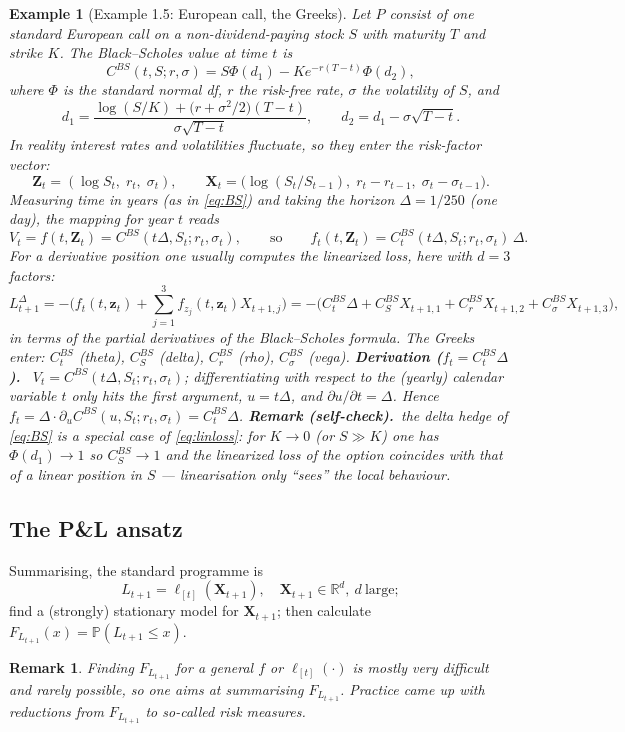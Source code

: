 \documentclass[11pt,a4paper]{article}
\newtheorem{example}{Example}
\newtheorem{remark}{Remark}
\newcommand{\real}{\mathbb{R}}
\renewcommand{\P}{\mathbb{P}}
\newcommand{\der}[1]{\medskip\noindent\textbf{Derivation (#1).}\ }
\newcommand{\selfcheck}[1]{\medskip\noindent\textbf{Remark (self-check).}\ \textit{#1}}
\begin{document}
\begin{example}[Example 1.5: European call, the Greeks]\label{ex:bs}
Let $P$ consist of one standard European call on a non-dividend-paying stock $S$ with maturity $T$
and strike $K$. The Black--Scholes value at time $t$ is
\begin{equation}\label{eq:BS}
  C^{BS}(t,S;r,\sigma)=S\Phi(d_1)-Ke^{-r(T-t)}\Phi(d_2),
\end{equation}
where $\Phi$ is the standard normal df, $r$ the risk-free rate, $\sigma$ the volatility of $S$, and
\[
  d_1=\frac{\log(S/K)+\big(r+\sigma^2/2\big)(T-t)}{\sigma\sqrt{T-t}},
  \qquad d_2=d_1-\sigma\sqrt{T-t}.
\]
In reality interest rates and volatilities fluctuate, so they enter the risk-factor vector:
\[
  \mathbf{Z}_t=(\log S_t,\; r_t,\; \sigma_t),\qquad
  \mathbf{X}_t=\big(\log(S_t/S_{t-1}),\; r_t-r_{t-1},\; \sigma_t-\sigma_{t-1}\big).
\]
Measuring time in years (as in \eqref{eq:BS}) and taking the horizon $\Delta=1/250$ (one day), the
mapping for year $t$ reads
\[
  V_t=f(t,\mathbf{Z}_t)=C^{BS}(t\Delta,S_t;r_t,\sigma_t),
  \qquad\text{so}\qquad
  f_t(t,\mathbf{Z}_t)=C^{BS}_t(t\Delta,S_t;r_t,\sigma_t)\,\Delta .
\]
For a derivative position one usually computes the linearized loss, here with $d=3$ factors:
\[
  L^{\Delta}_{t+1}=-\Big(f_t(t,\mathbf{z}_t)+\sum_{j=1}^{3}f_{z_j}(t,\mathbf{z}_t)X_{t+1,j}\Big)
                 =-\Big(C^{BS}_t\Delta
                        +C^{BS}_S X_{t+1,1}+C^{BS}_r X_{t+1,2}+C^{BS}_\sigma X_{t+1,3}\Big),
\]
in terms of the partial derivatives of the Black--Scholes formula. The Greeks enter:
$C^{BS}_t$ (theta), $C^{BS}_S$ (delta), $C^{BS}_r$ (rho), $C^{BS}_\sigma$ (vega).
\der{$f_t=C^{BS}_t\Delta$}
$V_t=C^{BS}(t\Delta,S_t;r_t,\sigma_t)$; differentiating with respect to the (yearly) calendar
variable $t$ only hits the first argument, $u=t\Delta$, and $\partial u/\partial t=\Delta$. Hence
$f_t=\Delta\cdot\partial_{u}C^{BS}(u,S_t;r_t,\sigma_t)=C^{BS}_t\Delta$.
\selfcheck{the delta hedge of \eqref{eq:BS} is a special case of \eqref{eq:linloss}: for
$K\to0$ (or $S\gg K$) one has $\Phi(d_1)\to1$ so $C^{BS}_S\to1$ and the linearized loss of the option
coincides with that of a linear position in $S$ --- linearisation only ``sees'' the local
behaviour.}
\end{example}

\subsection{The P\&L ansatz}
Summarising, the standard programme is
\[
  L_{t+1}=\ell_{[t]}(\mathbf{X}_{t+1}),\quad \mathbf{X}_{t+1}\in\real^d,\ d\ \text{large};
\]
find a (strongly) stationary model for $\mathbf{X}_{t+1}$; then calculate
$F_{L_{t+1}}(x)=\P(L_{t+1}\le x)$.
\begin{remark}
Finding $F_{L_{t+1}}$ for a general $f$ or $\ell_{[t]}(\cdot)$ is mostly very difficult and rarely
possible, so one aims at \emph{summarising} $F_{L_{t+1}}$. Practice came up with reductions from
$F_{L_{t+1}}$ to so-called \emph{risk measures}.
\end{remark}
\end{document}
